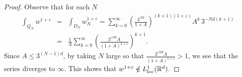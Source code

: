 \documentclass[11pt]{amsart}
\theoremstyle{definition}
\begin{document}
\bigskip

\begin{proof}
Observe that for each $N$
\begin{eqnarray*}
\int_{Q_N} w^{1+{\varepsilon}}&=&\int_{D_N} w_N^{1+{\varepsilon}}=\sum_{k=0}^\infty\left(\frac{3^{Nd}}{1+A}\right)^{(k+1)(1+{\varepsilon})}A^k\, 3^{-Nd(k+1)}
\\ &=& \frac 1{A} \sum_{k=0}^\infty\left(\frac{3^{{\varepsilon} Nd}A}{(1+A)^{1+{\varepsilon}}}\right)^{k+1}.
\end{eqnarray*}
Since $A\leq 3^{(N-1)d}$, by taking $N$ large so that $\displaystyle \frac{3^{{\varepsilon} Nd}A}{(1+A)^{1+{\varepsilon}}}>1$, we see that the series diverges to $\infty$. This shows that 
$w^{1+{\varepsilon}}\notin L^1_{\rm loc}(\mathbb R^d).$
\end{proof}

\bigskip
\end{document}
